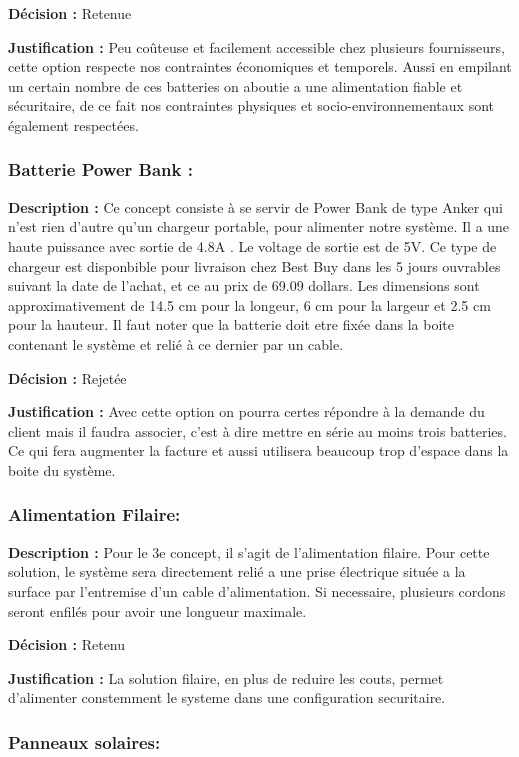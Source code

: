  \textbf{Décision :}
 Retenue
 
 \textbf{Justification :}
 Peu coûteuse et facilement accessible chez plusieurs fournisseurs, cette option respecte nos contraintes économiques et temporels. Aussi en empilant un certain nombre de ces batteries on aboutie a une alimentation fiable et sécuritaire, de ce fait nos contraintes physiques et socio-environnementaux sont également respectées.
 
\subsubsection{Batterie Power Bank :}
\textbf{Description :}
 Ce concept consiste à se servir de Power Bank de type Anker qui n'est rien d'autre qu'un chargeur portable, pour alimenter notre système. Il a une haute puissance avec sortie de 4.8A . Le voltage de sortie est de 5V. Ce type de chargeur est disponbible pour livraison chez Best Buy dans les 5 jours ouvrables suivant la date de l'achat, et ce au prix de 69.09 dollars. Les dimensions sont approximativement de 14.5 cm pour la longeur, 6 cm pour la largeur et 2.5 cm pour la hauteur. Il faut noter que la batterie doit etre fixée dans la boite contenant le système et relié à ce dernier par un cable.
 
\textbf{Décision :}
 Rejetée
 
\textbf{Justification :}
Avec cette option on pourra certes répondre à la demande du client mais il faudra associer, c'est à dire  mettre en série au moins trois batteries. Ce qui fera augmenter la facture et aussi utilisera beaucoup trop d'espace  dans la boite du système.
 
\subsubsection{Alimentation Filaire:}
\textbf{Description :}
Pour le 3e concept, il s'agit de l'alimentation filaire. Pour cette solution, le système sera directement relié a une prise électrique située a la surface par l'entremise d'un cable  d'alimentation. Si necessaire, plusieurs cordons seront enfilés pour avoir une longueur maximale.
 
 \textbf{Décision :}
 Retenu
 
 \textbf{Justification :}
 La solution filaire, en plus de reduire les couts, permet d'alimenter constemment le systeme dans une configuration securitaire.
\subsubsection{Panneaux solaires:}

